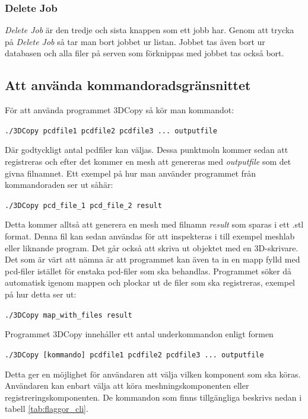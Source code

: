 \documentclass[a4paper,titlepage,12pt]{article}
\begin{document}
	\subsubsection{Delete Job}
	
	\textit{Delete Job} är den tredje och sista knappen som ett jobb har. Genom att trycka på \textit{Delete Job} så tar man bort jobbet ur listan. Jobbet tas även bort ur databasen och alla filer på serven som förknippas med jobbet tas också bort.
	
	\subsection{Att använda kommandoradsgränsnittet}
		För att använda programmet 3DCopy så kör man kommandot:
		
		\texttt{./3DCopy pcdfile1 pcdfile2 pcdfile3 ... outputfile}
		
		Där godtyckligt antal pcdfiler kan väljas. Dessa punktmoln kommer sedan att registreras och efter det kommer en mesh att genereras med \textit{outputfile} som det givna filnamnet. Ett exempel på hur man använder programmet från kommandoraden ser ut såhär:
		
		\texttt{./3DCopy pcd\_file\_1 pcd\_file\_2 result}
		
		Detta kommer alltså att generera en mesh med filnamn \textit{result} som sparas i ett .stl format. Denna fil kan sedan användas för att inspekteras i till exempel meshlab eller liknande program. Det går också att skriva ut objektet med en 3D-skrivare. Det som är värt att nämna är att programmet kan även ta in en mapp fylld med pcd-filer istället för enstaka pcd-filer som ska behandlas. Programmet söker då automatisk igenom mappen och plockar ut de filer som ska registreras, exempel på hur detta ser ut:
		
		\texttt{./3DCopy map\_with\_files result}
		
		Programmet 3DCopy innehåller ett antal underkommandon enligt formen
		
		\texttt{./3DCopy [kommando] pcdfile1 pcdfile2 pcdfile3 ... outputfile}
		
		Detta ger en möjlighet för användaren att välja vilken komponent som ska köras. Användaren kan enbart välja att köra meshningskomponenten eller registreringskomponenten. De kommandon som finns tillgängliga beskrivs nedan i tabell \ref{tab:flaggor_cli}.
		
\end{document}
